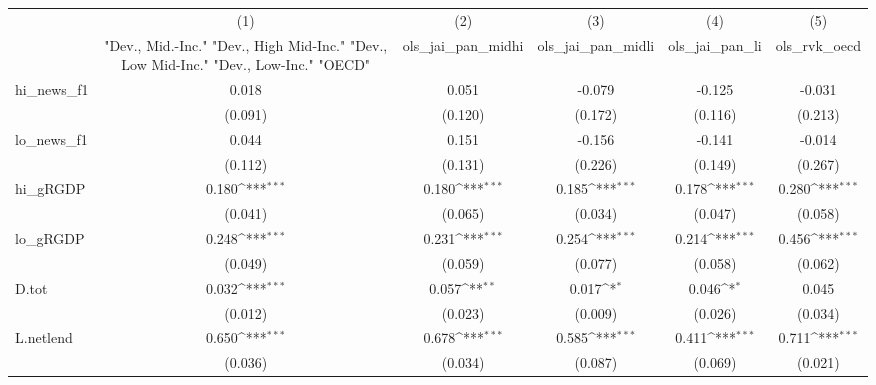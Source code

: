 {
\def\sym#1{\ifmmode^{#1}\else\(^{#1}\)\fi}
\begin{tabular}{l*{5}{c}}
\toprule
            &\multicolumn{1}{c}{(1)}&\multicolumn{1}{c}{(2)}&\multicolumn{1}{c}{(3)}&\multicolumn{1}{c}{(4)}&\multicolumn{1}{c}{(5)}\\
            &\multicolumn{1}{c}{ "Dev., Mid.-Inc." "Dev., High Mid-Inc." "Dev., Low Mid-Inc." "Dev., Low-Inc." "OECD" }&\multicolumn{1}{c}{ols\_jai\_pan\_midhi}&\multicolumn{1}{c}{ols\_jai\_pan\_midli}&\multicolumn{1}{c}{ols\_jai\_pan\_li}&\multicolumn{1}{c}{ols\_rvk\_oecd}\\
\midrule
hi\_news\_f1  &       0.018         &       0.051         &      -0.079         &      -0.125         &      -0.031         \\
            &     (0.091)         &     (0.120)         &     (0.172)         &     (0.116)         &     (0.213)         \\
\addlinespace
lo\_news\_f1  &       0.044         &       0.151         &      -0.156         &      -0.141         &      -0.014         \\
            &     (0.112)         &     (0.131)         &     (0.226)         &     (0.149)         &     (0.267)         \\
\addlinespace
hi\_gRGDP    &       0.180\sym{***}&       0.180\sym{***}&       0.185\sym{***}&       0.178\sym{***}&       0.280\sym{***}\\
            &     (0.041)         &     (0.065)         &     (0.034)         &     (0.047)         &     (0.058)         \\
\addlinespace
lo\_gRGDP    &       0.248\sym{***}&       0.231\sym{***}&       0.254\sym{***}&       0.214\sym{***}&       0.456\sym{***}\\
            &     (0.049)         &     (0.059)         &     (0.077)         &     (0.058)         &     (0.062)         \\
\addlinespace
D.tot       &       0.032\sym{***}&       0.057\sym{**} &       0.017\sym{*}  &       0.046\sym{*}  &       0.045         \\
            &     (0.012)         &     (0.023)         &     (0.009)         &     (0.026)         &     (0.034)         \\
\addlinespace
L.netlend   &       0.650\sym{***}&       0.678\sym{***}&       0.585\sym{***}&       0.411\sym{***}&       0.711\sym{***}\\
            &     (0.036)         &     (0.034)         &     (0.087)         &     (0.069)         &     (0.021)         \\

\end{tabular}}
